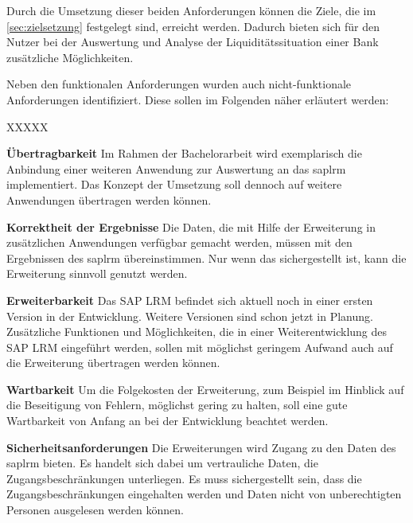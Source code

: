 \begin{onehalfspacing}
Durch die Umsetzung dieser beiden Anforderungen können die Ziele, die im \vref{sec:zielsetzung} festgelegt sind, erreicht werden. Dadurch bieten sich für den Nutzer bei der Auswertung und Analyse der Liquiditätssituation einer Bank zusätzliche Möglichkeiten.

Neben den funktionalen Anforderungen wurden auch nicht-funktionale Anforderungen identifiziert. Diese sollen im Folgenden näher erläutert werden:

\begin{seToplist}{ XXXXX }

\item[\anfl{uebertragbarkeit}] \textbf{Übertragbarkeit} \newline
Im Rahmen der Bachelorarbeit wird exemplarisch die Anbindung einer weiteren Anwendung zur Auswertung an das \gls{saplrm} implementiert. Das Konzept der Umsetzung soll dennoch auf weitere Anwendungen übertragen werden können.

\item[\anfl{korrektheit}] \textbf{Korrektheit der Ergebnisse} \newline
Die Daten, die mit Hilfe der Erweiterung in zusätzlichen Anwendungen verfügbar gemacht werden, müssen mit den Ergebnissen des \gls{saplrm} übereinstimmen. Nur wenn das sichergestellt ist, kann die Erweiterung sinnvoll genutzt werden.

\item[\anfl{erweiterbarkeit}] \textbf{Erweiterbarkeit} \newline
Das SAP LRM befindet sich aktuell noch in einer ersten Version in der Entwicklung. Weitere Versionen sind schon jetzt in Planung. Zusätzliche Funktionen und Möglichkeiten, die in einer Weiterentwicklung des SAP LRM eingeführt werden, sollen mit möglichst geringem Aufwand auch auf die Erweiterung übertragen werden können.

\item[\anfl{wartbarkeit}] \textbf{Wartbarkeit} \newline
Um die Folgekosten der Erweiterung, zum Beispiel im Hinblick auf die Beseitigung von Fehlern, möglichst gering zu halten, soll eine gute Wartbarkeit von Anfang an bei der Entwicklung beachtet werden.

\item[\anfl{sicherheit}] \textbf{Sicherheitsanforderungen} \newline
Die Erweiterungen wird Zugang zu den Daten des \gls{saplrm} bieten. Es handelt sich dabei um vertrauliche Daten, die Zugangsbeschränkungen unterliegen. Es muss sichergestellt sein, dass die Zugangsbeschränkungen eingehalten werden und Daten nicht von unberechtigten Personen ausgelesen werden können.


\end{seToplist}
\end{onehalfspacing}
